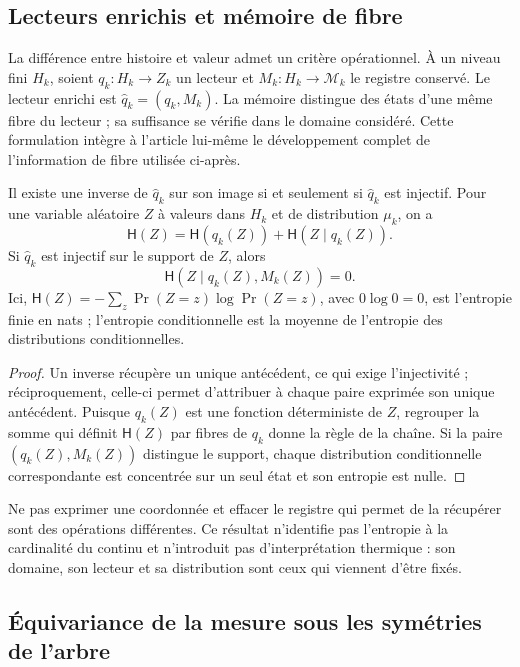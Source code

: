 \subsection{Lecteurs enrichis et mémoire de fibre}
\label{sec:ch-memoria-fibra}

La différence entre histoire et valeur admet un critère opérationnel. À un
niveau fini \(H_k\), soient \(q_k:H_k\to Z_k\) un lecteur et
\(M_k:H_k\to\mathcal M_k\) le registre conservé. Le lecteur enrichi
est \(\widehat q_k=(q_k,M_k)\). La mémoire distingue des états d'une même
fibre du lecteur ; sa suffisance se vérifie dans le domaine considéré.
Cette formulation intègre à l'article lui-même le développement complet de
l'information de fibre utilisée ci-après.

\begin{proposition}
\label{prop:ch-recuperabilidad-fibra}
Il existe une inverse de \(\widehat q_k\) sur son image si et seulement si \(\widehat q_k\) est injectif. Pour une variable aléatoire \(Z\) à valeurs dans \(H_k\) et de distribution \(\mu_k\), on a
\[
 \mathsf H(Z)=\mathsf H(q_k(Z))+\mathsf H(Z\mid q_k(Z)).
\]
Si \(\widehat q_k\) est injectif sur le support de \(Z\), alors
\[
 \mathsf H(Z\mid q_k(Z),M_k(Z))=0.
\]
Ici, \(\mathsf H(Z)=-\sum_z\Pr(Z=z)\log\Pr(Z=z)\), avec
\(0\log0=0\), est l'entropie finie en nats ; l'entropie conditionnelle est
la moyenne de l'entropie des distributions conditionnelles.
\end{proposition}

\begin{proof}
Un inverse récupère un unique antécédent, ce qui exige l’injectivité ;
réciproquement, celle-ci permet d’attribuer à chaque paire exprimée son unique
antécédent. Puisque \(q_k(Z)\) est une fonction déterministe de \(Z\),
regrouper la somme qui définit \(\mathsf H(Z)\) par fibres de \(q_k\) donne la
règle de la chaîne. Si la paire \((q_k(Z),M_k(Z))\) distingue le support,
chaque distribution conditionnelle correspondante est concentrée sur un seul
état et son entropie est nulle.

\end{proof}

Ne pas exprimer une coordonnée et effacer le registre qui permet de la récupérer sont
des opérations différentes. Ce résultat n’identifie pas l’entropie à la cardinalité
du continu et n’introduit pas d’interprétation thermique : son domaine, son lecteur et sa
distribution sont ceux qui viennent d’être fixés.


\subsection{Équivariance de la mesure sous les symétries de l'arbre}
\label{sec:ch-naturalidad-medida}

